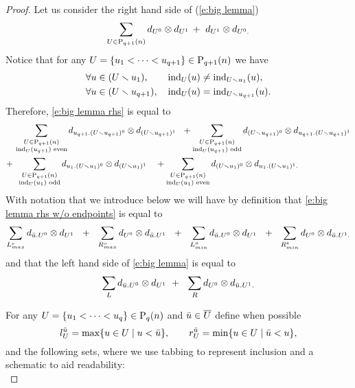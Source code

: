 \begin{proof}
	Let us consider the right hand side of (\ref{e:big lemma})
	\begin{equation} \label{e:big lemma rhs}
	\sum_{U \in \P_{q+1}(n)} d_{U^0} \otimes d_{U^1}\, +\ d_{U^1} \otimes d_{U^0.}
	\end{equation}
	Notice that for any $U = \{u_1 < \cdots < u_{q+1}\} \in \P_{q+1}(n)$ we have
	\begin{align*}
	& \forall u \in (U \sm u_1), \qquad \ind_{U}(u) \neq \ind_{U \sm u_1}(u), \\
	& \forall u \in (U \sm u_{q+1}), \quad \ind_{U}(u) = \ind_{U \sm u_{q+1}}(u).
	\end{align*}
	Therefore, \eqref{e:big lemma rhs} is equal to
	\begin{equation} \label{e:big lemma rhs w/o endpoints}
	\begin{split}
	&\, \sum_{\substack{U \in \P_{q+1}(n) \\ \ind_U(u_{q+1}) \text{ even}}}
	d_{u_{q+1}.(U \sm u_{q+1})^0} \otimes d_{(U \sm u_{q+1})^1}\ \ + 
	\sum_{\substack{U \in \P_{q+1}(n) \\ \ind_U(u_{q+1}) \text{ odd}}}
	d_{(U \sm u_{q+1})^0} \otimes d_{u_{q+1}.(U \sm u_{q+1})^1} \\ +
	&\ \,\sum_{\substack{U \in \P_{q+1}(n) \\ \ind_U(u_1) \text{ odd}}} d_{u_1.(U \sm u_1)^0} \otimes d_{(U\sm u_1)^1} \quad +
	\sum_{\substack{U \in \P_{q+1}(n) \\ \ind_U(u_1) \text{ even}}} d_{(U \sm u_1)^0} \otimes d_{u_1.(U\sm u_1)^1.}
	\end{split}
	\end{equation}
	With notation that we introduce below we will have by definition that \eqref{e:big lemma rhs w/o endpoints} is equal to
	\begin{equation} \label{e:big lemma rhs promising} 
	\sum_{{L}_{max}^{e}} d_{\bu.U^0} \otimes d_{U^1}\ \ +\ \ 
	\sum_{{R}_{max}^{o}} d_{U^0} \otimes d_{\bu.U^1}\ \ +\ \ 
	\sum_{{L}_{min}^{o}} d_{\bu.U^0} \otimes d_{U^1}\ \ +\ \ 
	\sum_{{R}_{min}^{e}} d_{U^0} \otimes d_{\bu.U^1.}
	\end{equation}
	and that the left hand side of \eqref{e:big lemma} is equal to
	\begin{equation} \label{e:big lemma lhs}
	\sum_{L} d_{\bu.U^0} \otimes d_{U^1}\ +\ \ 
	\sum_{R} d_{U^0} \otimes d_{\bu.U^1.}
	\end{equation}
	
	For any $U = \{u_1 < \cdots < u_q\} \in \P_{q}(n)$ and $\bu \in \overline{U}$ define when possible
	\begin{equation*}
	l_U^\bu = \max \{u \in U \mid u < \bu\}, \qquad
	r_U^\bu = \min\{u \in U \mid \bu < u\},
	\end{equation*}
	and the following sets, where we use tabbing to represent inclusion and a schematic to aid readability:\\
	

\end{proof}
